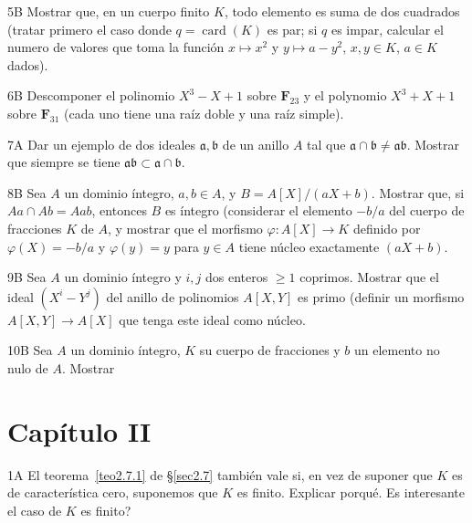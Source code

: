 \documentclass[10pt,oneside,bibtotoc,smallheadings,leqno,a5paper,DIV=12]{scrbook}
\newcommand{\FF}{\mathbf{F}}
\newcommand{\idl}[1]{\mathfrak{#1}}
\renewcommand{\to}[1][]{\xrightarrow{#1}}
\DeclareMathOperator{\card}{card}
\numberwithin{equation}{section}
\theoremstyle{defi}
\newcommand{\exername}{}
\newtheorem*{namedexer}{\exername}
\newenvironment{exer*}[1]{\renewcommand{\exername}{#1}\begin{namedexer}}{\end{namedexer}}
\theoremstyle{enonce}
\theoremstyle{rem}
\numberwithin{theorem}{section}
\numberwithin{proposition}{section}
\numberwithin{definition}{section}
\numberwithin{lemma}{section}
\numberwithin{corollary}{section}
\numberwithin{example}{section}
\numberwithin{footnote}{section}%
\begin{document}
\begin{exer*}{5B}
Mostrar que, en un cuerpo finito $K$, todo elemento es suma de dos cuadrados (tratar
primero el caso donde $q = \card(K)$ es par; si $q$ es impar, calcular el numero de valores
que toma la funci\'on $x\mapsto x^2$ y $y\mapsto a-y^2$, $x, y\in K$, $a\in K$ dados).
\end{exer*}

\begin{exer*}{6B}
Descomponer el polinomio $X^3-X+1$ sobre $\FF_{23}$ y el polynomio $X^3+X+1$ sobre
$\FF_{31}$ (cada uno tiene una ra\'iz doble y una ra\'iz simple).
\end{exer*}

\begin{exer*}{7A}
Dar un ejemplo de dos ideales $\idl{a}, \idl{b}$ de un anillo $A$ tal que
$\idl{a}\cap\idl{b}\neq\idl{a}\idl{b}$. Mostrar que siempre se tiene
$\idl{a}\idl{b}\subset\idl{a}\cap\idl{b}$.
\end{exer*}

\begin{exer*}{8B}
Sea $A$ un dominio \'integro, $a, b\in A$, y $B = A[X]/(aX+b)$.
Mostrar que, si $Aa\cap Ab=Aab$, entonces $B$ es \'integro (considerar
el elemento $-b/a$ del cuerpo de fracciones $K$ de $A$, y mostrar que el
morfismo $\varphi : A[X]\to K$ definido por $\varphi(X) = -b/a$ y $\varphi(y) = y$
para $y\in A$ tiene n\'ucleo exactamente $(aX+b)$.
\end{exer*}

\begin{exer*}{9B}
Sea $A$ un dominio \'integro y $i, j$ dos enteros $\geq 1$ coprimos. Mostrar que el
ideal $(X^i-Y^j)$ del anillo de polinomios $A[X,Y]$ es primo (definir un morfismo
$A[X,Y]\to A[X]$ que tenga este ideal como n\'ucleo.
\end{exer*}

\begin{exer*}{10B}
Sea $A$ un dominio \'integro, $K$ su cuerpo de fracciones y $b$ un elemento no nulo
de $A$. Mostrar 
\end{exer*}

\section*{Cap\'itulo II}

\begin{exer*}{1A}
El teorema~\ref{teo2.7.1} de \S\ref{sec2.7} tambi\'en vale si, en vez de suponer que $K$ es
de caracter\'istica cero, suponemos que $K$ es finito. Explicar porqu\'e. Es interesante
el caso de $K$ es finito?
\end{exer*}
\end{document}
